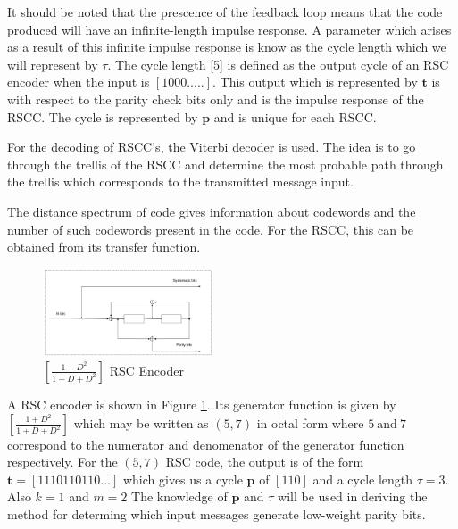 \documentclass[fontsize=12pt]{article}
\begin{document}
It should be noted that the prescence of the feedback loop means that the code produced will have an infinite-length impulse response. A parameter which arises as a result of this infinite impulse response is know as the cycle length which we will represent by $\tau$. The cycle length [5] is defined as the output cycle of an RSC encoder when the input is $[1 0 0 0 .....]$. This output which is represented by $\textbf{t}$ is with respect to the parity check bits only and is the impulse response of the RSCC. The cycle is represented by $\textbf{p}$ and is unique for each RSCC. 


For the decoding of RSCC's, the Viterbi decoder is used. The idea is to go through the trellis of the RSCC and determine the most probable path through the trellis which corresponds to the transmitted message input.

The distance spectrum of code gives information about codewords and the number of such codewords present in the code. For the RSCC, this can be obtained from its transfer function.  

\begin{figure}[h]
\centering
		\includegraphics[width=0.45\textwidth]{RSCExample3.pdf}
		\caption{$[\frac{1+D^2}{1+D+D^2}]$  RSC Encoder}
		\label{fig1}
		\end{figure}
		
A RSC encoder is shown in Figure \ref{fig1}. Its generator function is given by $[\frac{1+D^2}{1+D+D^2}]$ which may be written as $(5,7)$ in octal form where $5 ~ \text{and} ~ 7$ correspond to the numerator and denomenator of the generator function respectively. 
 For the $(5,7)$ RSC code, the output is of the form $\textbf{t}=[1 1 1 0 1 1 0 1 1 0 ...]$ which gives us a cycle $\textbf{p}$ of $[1 1 0]$ and a cycle length $\tau =3$. Also $k=1$ and $m=2$
The knowledge of $\textbf{p}$ and $\tau$ will be used in deriving the method for determing which input messages generate low-weight parity bits. 
\end{document}
